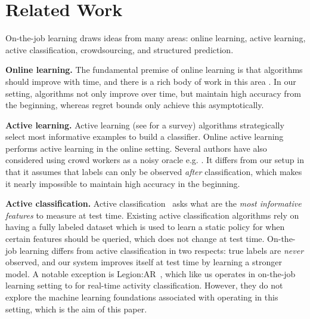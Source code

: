 \section{Related Work}
\label{sec:related}


On-the-job learning draws ideas from many areas:
online learning, active learning, active classification, crowdsourcing, and structured
prediction.


\textbf{Online learning.}
The fundamental premise of online learning is that algorithms should improve
with time, and there is a rich body of work in this area \citep{cesabianchi06prediction}.
In our setting, algorithms not only improve over time, but maintain high accuracy from the beginning,
whereas regret bounds only achieve this asymptotically.

\textbf{Active learning.}
Active learning (see \citet{settles2010active} for a survey) algorithms
strategically select most informative examples to build a classifier.
Online active learning
\citep{helmbold1997some,sculley2007online,chu2011unbiased}
performs active learning in the online setting.
Several authors have also considered using crowd workers as a noisy oracle
e.g. \citep{donmez2008proactive,golovin2010near}. %
It differs from our setup in that 
it assumes that labels can only be observed {\em after} classification,
which makes it nearly impossible to maintain high accuracy in the beginning.


\textbf{Active classification.}
Active classification~\cite{greiner2002learning,chai2004test,esmeir2007anytime}
asks what are the {\em most informative features} to measure at test time.
Existing active classification algorithms rely on having a fully labeled
dataset which is used to learn a static policy for when certain features should
be queried, which does not change at test time.
On-the-job learning differs from active classification in two respects: true
labels are {\em never} observed, and our system improves itself at test
time by learning a stronger model.
A notable exception is Legion:AR~\cite{lasecki2013real},
which like us operates in on-the-job learning setting
to for real-time activity classification.
However, they do not explore the machine learning foundations associated
with operating in this setting, which is the aim of this paper.

